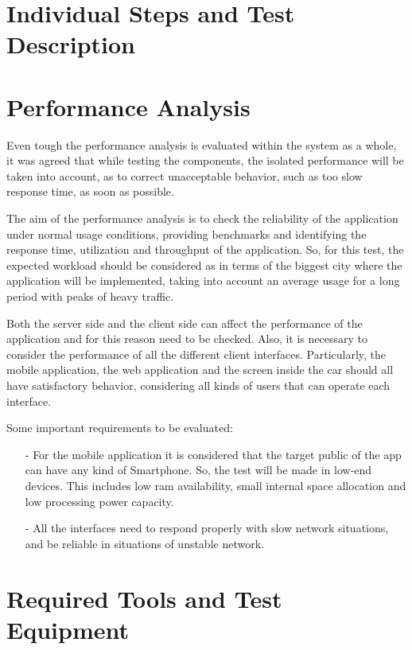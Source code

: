 \documentclass[a4paper]{article}
\begin{document}
\newpage
\section{Individual Steps and Test Description}
\newpage

\section{Performance Analysis}

Even tough the performance analysis is evaluated within the system as a whole, it was agreed that while testing the components, the isolated performance will be taken into account, as to correct unacceptable behavior, such as too slow response time, as soon as possible. 

The aim of the performance analysis is to check the reliability of the application under normal usage conditions, providing benchmarks and identifying the response time, utilization and throughput of the application. So, for this test, the expected workload should be considered as in terms of the biggest city where the application will be implemented, taking into account an average usage for a long period with peaks of heavy traffic. 

Both the server side and the client side can affect the performance of the application and for this reason need to be checked. Also,  it is necessary to consider the performance of all the different client interfaces. Particularly, the mobile application, the web application and the screen inside the car should all have satisfactory behavior, considering all kinds of users that can operate each interface. 

Some important requirements to be evaluated:
\begin{itemize}
\item[-] For the mobile application it is considered that the target public of the app can have any kind of Smartphone. So, the test will be made in low-end devices. This includes low ram availability, small internal space allocation and low processing power capacity.
\item[-] All the interfaces need to respond properly with slow network situations, and be reliable in situations of unstable network. 

\end{itemize}
\newpage


\section{Required Tools and Test Equipment}
\end{document}
